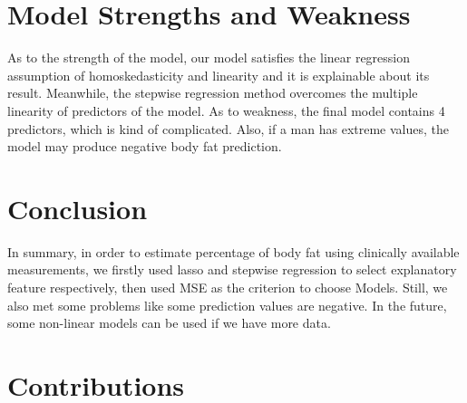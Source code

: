 \documentclass[12pt]{article}
\begin{document}
\vspace{-1.2cm}
\section{\vspace{-0.3cm}Model Strengths and Weakness}
As to the strength of the model, our model satisfies the linear regression assumption of homoskedasticity and linearity and it is explainable about its result. Meanwhile, the stepwise regression method overcomes the multiple linearity of predictors of the model. As to weakness, the final model contains 4 predictors, which is kind of complicated. Also, if a man has extreme values, the model may produce negative body fat prediction.

\vspace{-0.6cm}
\section{\vspace{-0.3cm}Conclusion}

In summary, in order to estimate percentage of body fat using clinically available measurements, we firstly used lasso and stepwise regression to select explanatory feature respectively, then used MSE as the criterion to choose Models. Still, we also met some problems like some prediction values are negative. In the future, some non-linear models can be used if we have more data.


\newpage
\section{\vspace{-0.3cm}Contributions}
\end{document}
